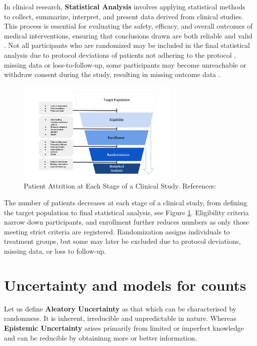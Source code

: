 In clinical research, \textbf{Statistical Analysis} involves applying statistical methods to collect, summarize, interpret, and present data derived from clinical studies. This process is essential for evaluating the safety, efficacy, and overall outcomes of medical interventions, ensuring that conclusions drawn are both reliable and valid \citep{panos2023statistical}. Not all participants who are randomized may be included in the final statistical analysis due to protocol deviations of patients not adhering to the protocol \citep{rehman2020exclusion}, missing data \citep{shih2002problems} or loss-to-follow-up, some participants may become unreachable or withdraw consent during the study, resulting in missing outcome data \citep{nuesch2009effects}.

\begin{figure}[h]
  \centering
  \includegraphics[width=0.7\textwidth]{fig_2_1.png}
  \caption{Patient Attrition at Each Stage of a Clinical Study. References: \cite{piantadosi2022principles, whelan2018high, bogin2022lasagna}}
  \label{fig:2_1}
\end{figure}

The number of patients decreases at each stage of a clinical study, from defining the target population to final statistical analysis, see Figure \ref{fig:2_1}. Eligibility criteria narrow down participants, and enrollment further reduces numbers as only those meeting strict criteria are registered. Randomization assigns individuals to treatment groups, but some may later be excluded due to protocol deviations, missing data, or loss to follow-up. 


\section{Uncertainty and models for counts}

Let us define \textbf{Aleatory Uncertainty} as that which can be characterised by randomness. It is inherent, irreducible and unpredictable in nature. Whereas \textbf{Epistemic Uncertainty} arises primarily from limited or imperfect knowledge and can be reducible by obtaininng more or better information. 

